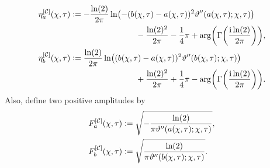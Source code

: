 \begin{equation}
\begin{split}
\eta_a^{[\channels]}(\chi,\tau)&\defeq -\frac{\ln(2)}{2\pi}\ln\left(-(b(\chi,\tau)-a(\chi,\tau))^2\vartheta''(a(\chi,\tau);\chi,\tau)\right)\\&\qquad\qquad\qquad\qquad{}-\frac{\ln(2)^2}{2\pi}-\frac{1}{4}\pi+\arg\left(\Gamma\left(\frac{\ii\ln(2)}{2\pi}\right)\right),\\
\eta_b^{[\channels]}(\chi,\tau)&\defeq \frac{\ln(2)}{2\pi}\ln\left((b(\chi,\tau)-a(\chi,\tau))^2\vartheta''(b(\chi,\tau);\chi,\tau)\right)\\
&\qquad\qquad\qquad\qquad{}+\frac{\ln(2)^2}{2\pi}+\frac{1}{4}\pi-\arg\left(\Gamma\left(\frac{\ii\ln(2)}{2\pi}\right)\right).
\end{split}
\label{eq:channels-lower-order-phases}
\end{equation}
Also, define two positive amplitudes by
\begin{equation}
\begin{split}
F_a^{[\mathcal{C}]}(\chi,\tau)&\vcentcolon= \sqrt{-\frac{\ln(2)}{\pi\vartheta''(a(\chi,\tau);\chi,\tau)}},\\
F_b^{[\mathcal{C}]}(\chi,\tau)&\vcentcolon= \sqrt{\frac{\ln(2)}{\pi\vartheta''(b(\chi,\tau);\chi,\tau)}}.
\end{split}
\label{eq:channels-amplitudes}
\end{equation}
